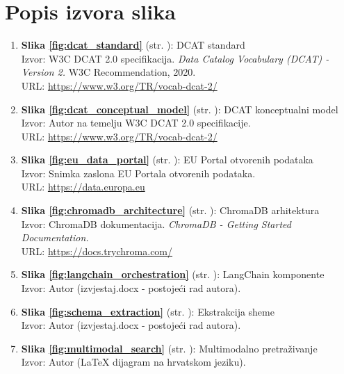 \chapter*{Popis izvora slika}

\begin{enumerate}

\item \textbf{Slika \ref{fig:dcat_standard}} (str. \pageref{fig:dcat_standard}): DCAT standard \\
Izvor: W3C DCAT 2.0 specifikacija. \textit{Data Catalog Vocabulary (DCAT) - Version 2.} W3C Recommendation, 2020. \\
URL: \url{https://www.w3.org/TR/vocab-dcat-2/}

\item \textbf{Slika \ref{fig:dcat_conceptual_model}} (str. \pageref{fig:dcat_conceptual_model}): DCAT konceptualni model \\
Izvor: Autor na temelju W3C DCAT 2.0 specifikacije. \\
URL: \url{https://www.w3.org/TR/vocab-dcat-2/}

\item \textbf{Slika \ref{fig:eu_data_portal}} (str. \pageref{fig:eu_data_portal}): EU Portal otvorenih podataka \\
Izvor: Snimka zaslona EU Portala otvorenih podataka. \\
URL: \url{https://data.europa.eu}

\item \textbf{Slika \ref{fig:chromadb_architecture}} (str. \pageref{fig:chromadb_architecture}): ChromaDB arhitektura \\
Izvor: ChromaDB dokumentacija. \textit{ChromaDB - Getting Started Documentation.} \\
URL: \url{https://docs.trychroma.com/}

\item \textbf{Slika \ref{fig:langchain_orchestration}} (str. \pageref{fig:langchain_orchestration}): LangChain komponente \\
Izvor: Autor (izvjestaj.docx - postojeći rad autora).

\item \textbf{Slika \ref{fig:schema_extraction}} (str. \pageref{fig:schema_extraction}): Ekstrakcija sheme \\
Izvor: Autor (izvjestaj.docx - postojeći rad autora).

\item \textbf{Slika \ref{fig:multimodal_search}} (str. \pageref{fig:multimodal_search}): Multimodalno pretraživanje \\
Izvor: Autor (LaTeX dijagram na hrvatskom jeziku).


\end{enumerate}
